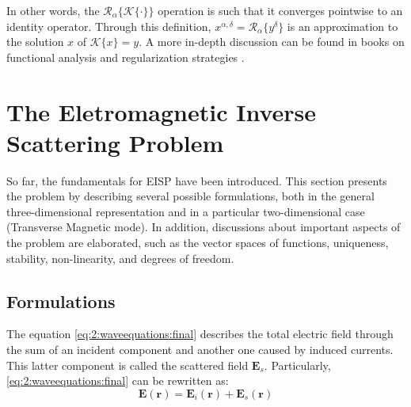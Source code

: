		In other words, the $\mathcal{R}_\alpha\{\mathcal{K}\{\cdot\}\}$ operation is such that it converges pointwise to an identity operator. Through this definition, $x^{\alpha, \delta} = \mathcal{R}_\alpha\{y^\delta\}$ is an approximation to the solution $x$ of $\mathcal{K}\{x\}=y$. A more in-depth discussion can be found in books on functional analysis and regularization strategies \citep{kirsch2011introduction,lebedev1996functional}.
	
	\section{The Eletromagnetic Inverse Scattering Problem}\label{chap:problemstatement:eisp}
	
		So far, the fundamentals for EISP have been introduced. This section presents the problem by describing several possible formulations, both in the general three-dimensional representation and in a particular two-dimensional case (Transverse Magnetic mode). In addition, discussions about important aspects of the problem are elaborated, such as the vector spaces of functions, uniqueness, stability, non-linearity, and degrees of freedom.
	
		\subsection{Formulations}\label{chap:problemstatement:eisp:1}
			The equation \eqref{eq:2:waveequations:final} describes the total electric field through the sum of an incident component and another one caused by induced currents. This latter component is called the scattered field $\mathbf{E}_s$. Particularly, \eqref{eq:2:waveequations:final} can be rewritten as:
			\begin{equation}
				\mathbf{E}(\mathbf{r}) = \mathbf{E}_i(\mathbf{r}) + \mathbf{E}_s(\mathbf{r}) \label{eq:2:eisp:1}
			\end{equation}
	
